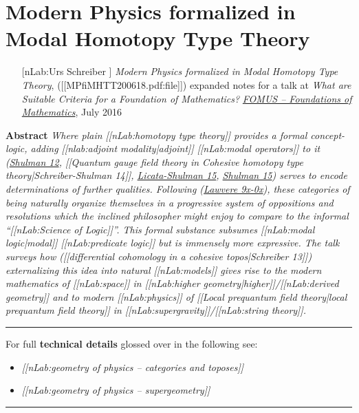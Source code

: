 \documentclass[12pt,titlepage]{article}
\theoremstyle{plain}
\theoremstyle{definition}
\theoremstyle{remark}
\begin{document}
\section*{Modern Physics formalized in Modal Homotopy Type Theory}
\begin{itemize}%
\item [[nLab:Urs Schreiber]]
\emph{Modern Physics formalized in Modal Homotopy Type Theory},
 ([[MPfiMHTT200618.pdf:file]])
expanded notes for a talk at
\emph{What are Suitable Criteria for a Foundation of Mathematics?}
\emph{\href{http://fomus.weebly.com/}{FOMUS -- Foundations of Mathematics}}, July 2016
\end{itemize}
\textbf{Abstract} \emph{Where plain [[nLab:homotopy type theory]] provides a formal concept-logic, adding [[nlab:adjoint modality|adjoint]] [[nLab:modal operators]] to it (\href{modal+type+theory}{Shulman 12}, [[Quantum gauge field theory in Cohesive homotopy type theory|Schreiber-Shulman 14]], \hyperlink{LicataShulman}{Licata-Shulman 15}, \hyperlink{Shulman15}{Shulman 15}) serves to encode determinations of further qualities. Following (\href{cohesive+topos#References}{Lawvere 9x-0x}), these categories of being naturally organize themselves in a progressive system of oppositions and resolutions which the inclined philosopher might enjoy to compare to the informal ``[[nLab:Science of Logic]]''. This formal substance subsumes [[nLab:modal logic|modal]] [[nLab:predicate logic]] but is immensely more expressive. The talk surveys how ([[differential cohomology in a cohesive topos|Schreiber 13]]) externalizing this idea into natural [[nLab:models]] gives rise to the modern mathematics of [[nLab:space]] in [[nLab:higher geometry|higher]]/[[nLab:derived geometry]] and to modern [[nLab:physics]] of [[Local prequantum field theory|local prequantum field theory]] in [[nLab:supergravity]]/[[nLab:string theory]].}
$\,$
\vspace{.5em} \hrule \vspace{.5em}
For full \textbf{technical details} glossed over in the following see:
\begin{itemize}%
\item \emph{[[nLab:geometry of physics -- categories and toposes]]}
\item \emph{[[nLab:geometry of physics -- supergeometry]]}
\end{itemize}
\vspace{.5em} \hrule \vspace{.5em}
\end{document}
